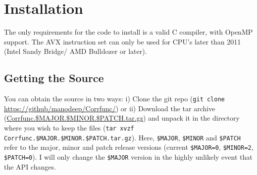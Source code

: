 \documentclass[12pt,titlepage]{article}
\begin{document}

\section{Installation}
The only requirements for the code to install is a valid C compiler, with OpenMP support. The AVX
instruction set can only be used for CPU's later than 2011 (Intel Sandy Bridge/ AMD Bulldozer or later). 

\subsection{Getting the Source}
You can obtain the source in two ways: i) Clone the git repo (\texttt{git clone} \url{https://github/manodeep/Corrfunc/}) 
or ii) Download the tar archive (\href{https://github.com/manodeep/Corrfunc/releases/latest}{Corrfunc.\$MAJOR.\$MINOR.\$PATCH.tar.gz}) and 
unpack it in the directory where you wish to keep the files (\texttt{tar
  xvzf}\\ \texttt{Corrfunc.\$MAJOR.\$MINOR.\$PATCH.tar.gz}). Here,
\texttt{\$MAJOR}, \texttt{\$MINOR} and \texttt{\$PATCH} refer to the major,
minor and patch release versions (current \texttt{\$MAJOR=0},
\texttt{\$MINOR=2}, \texttt{\$PATCH=0}). I will only change 
the \texttt{\$MAJOR} version in the highly unlikely event that the API changes. 
\end{document}
